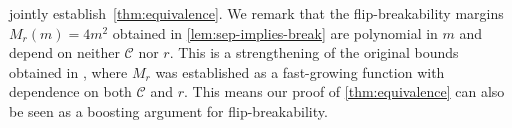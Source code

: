 \documentclass[a4paper,UKenglish,cleveref, autoref, thm-restate]{lipics-v2021}
\newcommand{\CC}{\mathcal{C}}
\begin{document}
 jointly establish~\cref{thm:equivalence}. We remark that the flip-breakability margins $M_r(m) = 4m^2$ obtained in \cref{lem:sep-implies-break} are polynomial in $m$ and depend on neither $\CC$ nor $r$. This is a strengthening of the original bounds obtained in \cite{flip-breakability}, where $M_r$ was established as a fast-growing function with dependence on both $\CC$ and $r$.
This means our proof of \cref{thm:equivalence} can also be seen as a boosting argument for flip-breakability.
 





\appendix
\end{document}
